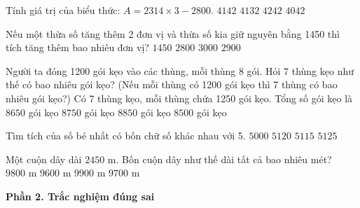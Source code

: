 \begin{ex} %
Tính giá trị của biểu thức: $A = 2314 \times 3 - 2800$.
\choice
{\True $4142$}
{$4132$}
{$4242$}
{$4042$}
\end{ex}

\begin{ex} %
Nếu một thừa số tăng thêm 2 đơn vị và thừa số kia giữ nguyên bằng 1450 thì tích tăng thêm bao nhiêu đơn vị?
\choice
{$1450$}
{$2800$}
{$3000$}
{\True $2900$}
\end{ex}

\begin{ex} %
Người ta đóng 1200 gói kẹo vào các thùng, mỗi thùng 8 gói. Hỏi 7 thùng kẹo như thế có bao nhiêu gói kẹo? (Nếu mỗi thùng có 1200 gói kẹo thì 7 thùng có bao nhiêu gói kẹo?) Có 7 thùng kẹo, mỗi thùng chứa 1250 gói kẹo. Tổng số gói kẹo là
\choice
{$8650$ gói kẹo}
{\True $8750$ gói kẹo}
{$8850$ gói kẹo}
{$8500$ gói kẹo}
\end{ex}

\begin{ex} %
Tìm tích của số bé nhất có bốn chữ số khác nhau với 5.
\choice
{$5000$}
{$5120$}
{\True $5115$}
{$5125$}
\end{ex}

\begin{ex} %
Một cuộn dây dài $2450\text{ m}$. Bốn cuộn dây như thế dài tất cả bao nhiêu mét?
\choice
{\True $9800\text{ m}$}
{$9600\text{ m}$}
{$9900\text{ m}$}
{$9700\text{ m}$}
\end{ex}

\textbf{Phần 2. Trắc nghiệm đúng sai}

